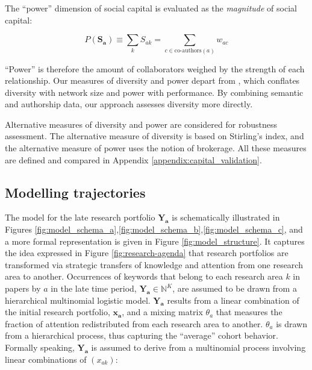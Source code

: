 \documentclass{article}
\begin{document}
The ``power'' dimension of social capital is evaluated as the \textit{magnitude} of social capital:

\begin{equation}
    P(\bm{S_a})\equiv \sum_k S_{ak} = \sum_{c \in \text{co-authors}(a)} w_{ac}
\end{equation}

``Power'' is therefore the amount of collaborators weighed by the strength of each relationship. Our measures of diversity and power depart from \citealt{Abbasi2014}, which conflates diversity with network size and power with performance. By combining semantic and authorship data, our approach assesses diversity more directly. %

Alternative measures of diversity and power are considered for robustness assessment. The alternative measure of diversity is based on Stirling's index, and the alternative measure of power uses the notion of brokerage. All these measures are defined and compared in Appendix \ref{appendix:capital_validation}. 

\subsection{\label{sec:model}Modelling trajectories}

The model for the late research portfolio $\bm{Y_a}$ is schematically illustrated in Figures \ref{fig:model_schema_a},\ref{fig:model_schema_b},\ref{fig:model_schema_c}, and a more formal representation is given in Figure \ref{fig:model_structure}. It captures the idea expressed in Figure \ref{fig:research-agenda} that research portfolios are transformed via strategic transfers of knowledge and attention from one research area to another. Occurrences of keywords that belong to each research area $k$ in papers by $a$ in the late time period, $\bm{Y_{a}} \in \mathbb{N}^K$, are assumed to be drawn from a hierarchical multinomial logistic model. $\bm{Y_{a}}$ results from a linear combination of the initial research portfolio, $\bm{x_{a}}$, and a mixing matrix $\theta_a$ that measures the fraction of attention redistributed from each research area to another. $\theta_a$ is drawn from a hierarchical process, thus capturing the ``average'' cohort behavior. %
Formally speaking, $\bm{Y_{a}}$ is assumed to derive from a multinomial process involving linear combinations of $(x_{ak})$:
\end{document}
